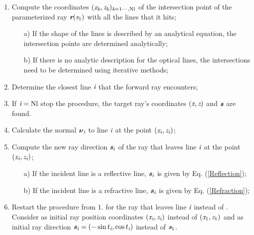 \begin{enumerate}
 \itemGiven a ray that leaves $\point{S}$ with initial position $(\variabile{x}_1, \variabile{z}_1)$ and initial direction $\vect{s}_1~=~(-\sin \optangle_1, \cos \optangle_1)$, use Eq. ($\ref{parametrization}$) to implement the ray parametrization $\vect{r}(\variabile{s}_1)$;
\item Compute the coordinates $(\textit{x}_{\textit{k}}, \textit{z}_{\textit{k}})_{\textit{k} = 1\cdots, \textrm{Nl}}$ of the intersection point of the parameterized ray $\vect{r}(\variabile{s}_1)$ with all the lines that it hits;
\begin{itemize}
\item[a)] If the shape of the lines is described by an analytical equation, the intersection points are determined analytically;
\item[b)] If there is no analytic description for the optical lines, the intersections need to be determined using iterative methods;
\end{itemize}
\item  Determine the closest line $\textit{i}$ that the forward ray encounters;
\item If $\textit{i} = \textrm{Nl}$ stop the procedure, the target ray's coordinates $(\textit{x}, \textit{z})$ and $\textit{\textbf{s}}$ are found.
\item Calculate the normal $\boldsymbol{\nu}_{\textit{i}}$ to line $\textit{i}$ at the point $(\textit{x}_{\textit{i}}, \textit{z}_{\textit{i}})$;
 \item Compute the new ray direction $\textit{\textbf{s}}_{\textit{i}}$ of the ray that leaves line $\textit{i}$ at the point $(\textit{x}_{\textit{i}}, \textit{z}_{\textit{i}})$;
\begin{itemize}
\item[a)] If the incident line is a reflective line, $\textit{\textbf{s}}_{\textit{i}}$ is given by Eq. (\ref{Reflection});
\item[b)] If the incident line is a refractive line, $\textit{\textbf{s}}_{\textit{i}}$ is given by Eq. (\ref{Refraction});
\end{itemize}
\item Restart the procedure from $1.$ for the ray that leaves line $\textit{i}$ instead of . Consider as initial ray position coordinates $(\textit{x}_{\textit{i}}, \textit{z}_{\textit{i}})$ instead of $(\variabile{x}_1, \variabile{z}_1)$ and as initial ray direction $\textit{\textbf{s}}_{\textit{i}}= (-\sin t_{\textit{i}}, \cos t_{\textit{i}})$ instead of $\textit{\textbf{s}}_1$.
\end{enumerate}
